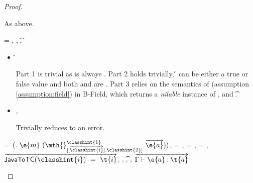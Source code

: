 \begin{lemma}
\begin{proof}
\begin{case}[T-NewStatic]
\begin{itemize}
\begin{subcase}[BE-New2]
        As above.

\end{subcase}
\end{itemize}
\end{case}

\begin{case}[T-FieldStatic]
  \e{} = { {} {\fld{}} {}},
   {\class{}},
   {\t{}},
  \judgementtwo {\propenv{}} { {\class{}}}

\begin{itemize}
  \item[]
\begin{subcase}[B-Field]
  \opsem {\openv{}}
         {} 
         { {\classfieldpair{\fld{}} {\v{}}}}


Part 1 is trivial as \object{} is always \emptyobject{}.
Part 2 holds trivially, \v{} can be either a true or false value
and both {\thenprop{\prop{}}} and {\elseprop{\prop{}}}
are \topprop{}.
Part 3 relies on the semantics of \getfieldliteral (assumption \ref{assumption:field})
in B-Field, which returns a \emph{nilable} instance of ,
and  {\t{}}.
\end{subcase}
  \item[]
\begin{subcase}[BE-Field]
  \opsem {\openv{}}
         {} 
         {\errorvalv{}},
  \opsem {\openv{}}
         {\e{}}
         {\errorvalv{}}

         Trivially reduces to an error.

\end{subcase}

\end{itemize}
\end{case}

\begin{case}[T-MethodStatic]
  \e{} = ${\methodstaticexp {\classhint{1}} 
                          {\overrightarrow {\classhint{i}}} 
                          {\classhint{2}}
                          {\mth{}} {\e{m}} {\overrightarrow{\e{a}}}}$,
  \thenprop{\prop{}} = \topprop{}, \elseprop{\prop{}} = \topprop{}, \object{} = \emptyobject{},
  $\overrightarrow{\javatotc {\classhint{i}} {\t{i}}}$,
              {\class{}},
              {\t{}},
  \judgementtwo {\propenv{}} { {\class{}}},
             $\overrightarrow{
  \judgementtwo {\propenv{}} {\hastype {\e{a}} {\t{a}}}
                  }$


\end{case}
\end{proof}
\end{lemma}
